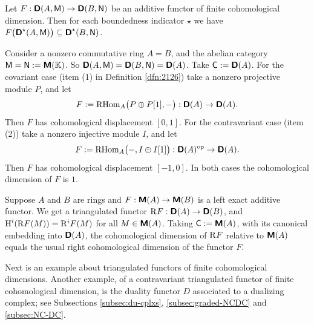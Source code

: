 \begin{exa} \label{exa:4285}
Let $F : \boldsymbol{\mathsf{D}}(A, \operatorname{\mathsf{M}}) \to \boldsymbol{\mathsf{D}}(B, \operatorname{\mathsf{N}})$
be an additive functor of finite cohomological dimension.
Then for each boundedness indicator $\star$ we have 
$F \bigl( \boldsymbol{\mathsf{D}}^{\star}(A, \operatorname{\mathsf{M}}) \bigr) \subseteq 
\boldsymbol{\mathsf{D}}^{\star}(B, \operatorname{\mathsf{N}})$.
\end{exa}

\begin{exa} \label{exa:2125}
Consider a nonzero commutative ring $A = B$, and the abelian category
$\operatorname{\mathsf{M}} = \operatorname{\mathsf{N}} := \boldsymbol{\mathsf{M}}(\mathbb{K})$. So 
$\boldsymbol{\mathsf{D}}(A, \operatorname{\mathsf{M}}) = \boldsymbol{\mathsf{D}}(B, \operatorname{\mathsf{N}}) = \boldsymbol{\mathsf{D}}(A)$.
Take $\operatorname{\mathsf{C}} := \boldsymbol{\mathsf{D}}(A)$.
For the covariant case (item (1) in Definition \ref{dfn:2126}) take a nonzero 
projective module $P$, and let
\[ F := \operatorname{RHom}_A \bigl( P \oplus P[1], - \bigr) : \boldsymbol{\mathsf{D}}(A) \to 
\boldsymbol{\mathsf{D}}(A) . \]
Then $F$ has cohomological displacement $[0, 1]$. 
For the contravariant case (item (2)) take a nonzero 
injective module $I$, and let 
\[ F := \operatorname{RHom}_A \bigl( -, I \oplus I[1] \bigr) : \boldsymbol{\mathsf{D}}(A)^{\mathrm{op}} 
\to \boldsymbol{\mathsf{D}}(A) . \]
Then $F$ has cohomological displacement $[-1, 0]$. 
In both cases the cohomological dimension of $F$ is $1$. 
\end{exa}

\begin{exa} \label{exa:2135}
Suppose $A$ and $B$ are rings and 
$F : \boldsymbol{\mathsf{M}}(A) \to \boldsymbol{\mathsf{M}}(B)$ is a left exact additive functor. 
We get a triangulated functor 
$\mathrm{R} F : \boldsymbol{\mathsf{D}}(A) \to \boldsymbol{\mathsf{D}}(B)$,
and $\operatorname{H}^i(\mathrm{R} F(M)) = \mathrm{R}^i F(M)$ for all $M \in \boldsymbol{\mathsf{M}}(A)$. 
Taking $\operatorname{\mathsf{C}} := \boldsymbol{\mathsf{M}}(A)$, with its canonical embedding into
$\boldsymbol{\mathsf{D}}(A)$, the cohomological dimension of $\mathrm{R} F$ relative to 
$\boldsymbol{\mathsf{M}}(A)$ equals the usual right cohomological dimension of the functor 
$F$. 
\end{exa}

Next is an example about triangulated functors of finite 
cohomological dimensions. Another example, of a contravariant triangulated 
functor of finite cohomological dimension, is the duality functor $D$ 
associated to a dualizing complex; see Subsections \ref{subsec:du-cplxs},
\ref{subsec:graded-NCDC} and \ref{subsec:NC-DC}.

